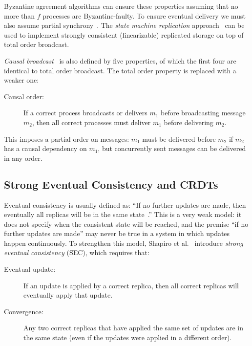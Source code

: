 \documentclass[a4paper,anonymous,USenglish]{lipics-v2019}
\begin{document}
Byzantine agreement algorithms can ensure these properties assuming that no more than $f$ processes are Byzantine-faulty.
To ensure eventual delivery we must also assume partial synchrony~\cite{Dwork:1988}.
The \emph{state machine replication} approach~\cite{Schneider:1990} can be used to implement strongly consistent (linearizable) replicated storage on top of total order broadcast.

\emph{Causal broadcast}~\cite{Birman:1991el,Cachin:2011wt} is also defined by five properties, of which the first four are identical to total order broadcast.
The total order property is replaced with a weaker one:

\begin{description}
\item[Causal order:] If a correct process broadcasts or delivers $m_1$ before broadcasting message $m_2$, then all correct processes must deliver $m_1$ before delivering $m_2$.
\end{description}

This imposes a partial order on messages: $m_1$ must be delivered before $m_2$ if $m_2$ has a causal dependency on $m_1$, but concurrently sent messages can be delivered in any order.

\subsection{Strong Eventual Consistency and CRDTs}\label{sec:applications}

Eventual consistency is usually defined as: ``If no further updates are made, then eventually all replicas will be in the same state~\cite{Vogels:2009ca}.''
This is a very weak model: it does not specify when the consistent state will be reached, and the premise ``if no further updates are made'' may never be true in a system in which updates happen continuously.
To strengthen this model, Shapiro et al.~\cite{Shapiro:2011} introduce \emph{strong eventual consistency} (SEC), which requires that:

\begin{description}
\item[Eventual update:] If an update is applied by a correct replica, then all correct replicas will eventually apply that update.
\item[Convergence:] Any two correct replicas that have applied the same set of updates are in the same state (even if the updates were applied in a different order).
\end{description}
\end{document}
